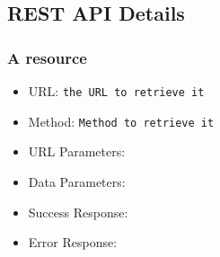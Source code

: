 \subsection{REST API Details}


\subsubsection*{A resource}


\lipsum[1]


\begin{itemize}
    \item URL: \texttt{the URL to retrieve it}
    \item Method: \texttt{Method to retrieve it}
    \item URL Parameters:
    \item Data Parameters: 
    \item Success Response:
    \item Error Response:
    
\end{itemize}

